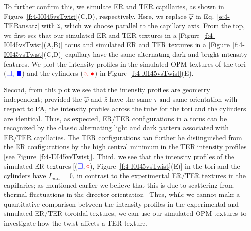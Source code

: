 To further confirm this, we simulate ER and TER capillaries, as shown in Figure~\ref{f:4-I0I45vsTwist}(C,D), respectively.
Here, we replace $\hat{\varphi}$ in Eq.~\ref{e:4-TERansatz} with $\hat{z}$, which we choose parallel to the capillary axis.
From the top, we first see that our simulated ER and TER textures in a [Figure~\ref{f:4-I0I45vsTwist}(A,B)] torus and simulated ER and TER textures in a [Figure~\ref{f:4-I0I45vsTwist}(C,D)] capillary have the same alternating dark and bright intensity features.
We plot the intensity profiles in the simulated OPM textures of the tori (${\color{blue} \square,\,\blacksquare}$) and the cylinders (${\color{red} \circ,\,\bullet}$) in Figure~\ref{f:4-I0I45vsTwist}(E).

Second, from this plot we see that the intensity profiles are geometry independent; provided the $\hat{\varphi}$ and $\hat{z}$ have the same $\tau$ and same orientation with respect to PA, the intensity profiles across the tube for the tori and the cylinders are identical.
Thus, as expected, ER/TER configurations in a torus can be recognized by the classic alternating light and dark pattern associated with ER/TER capillaries.
The TER configurations can further be distinguished from the ER configurations by the high central minimum in the TER intensity profiles [see Figure~\ref{f:4-I0I45vsTwist}].
Third, we see that the intensity profiles of the simulated ER textures [(${\color{blue} \square},{\color{red} \circ}$), Figure~\ref{f:4-I0I45vsTwist}(E)] in the tori and the cylinders have $I_{min} = 0$, in contrast to the experimental ER/TER textures in the capillaries; as mentioned earlier we believe that this is due to scattering from thermal fluctuations in the director orientation~\cite{RN33,RN309}
Thus, while we cannot make a quantitative comparison between the intensity profiles in the experimental and simulated ER/TER toroidal textures, we can use our simulated OPM textures to investigate how the twist affects a TER texture.


